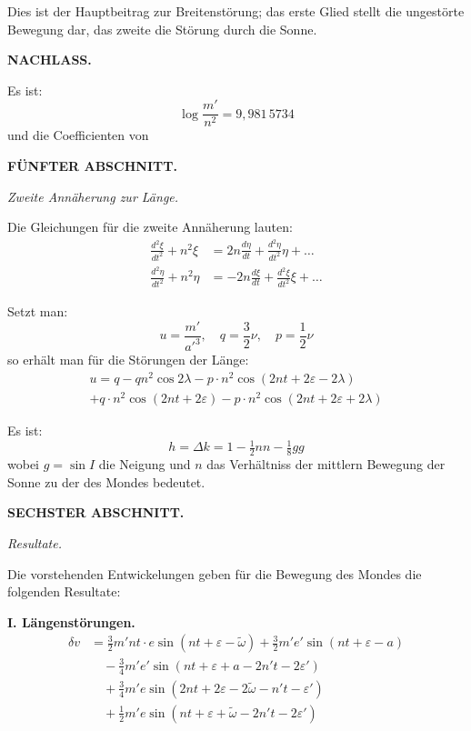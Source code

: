 \documentclass[10pt,a4paper]{article}
\begin{document}
Dies ist der Hauptbeitrag zur Breitenst\"orung; das erste Glied stellt die ungest\"orte Bewegung dar, das zweite die St\"orung durch die Sonne.

\newpage
\noindent\textbf{NACHLASS.}

\bigskip
\noindent
[9.] Es ist:
\begin{equation*}
\log\frac{m'}{n^2} = 9{,}981\,5734
\end{equation*}
und die Coefficienten von

\medskip
\noindent\textbf{F\"UNFTER ABSCHNITT.}

\medskip
\noindent\textit{Zweite Ann\"aherung zur L\"ange.}

\medskip
\noindent
[10.] Die Gleichungen f\"ur die zweite Ann\"aherung lauten:
\begin{align*}
\frac{d^2\xi}{dt^2} + n^2\xi &= 2n\frac{d\eta}{dt} + \frac{d^2\eta}{dt^2}\eta + \dots \\
\frac{d^2\eta}{dt^2} + n^2\eta &= -2n\frac{d\xi}{dt} + \frac{d^2\xi}{dt^2}\xi + \dots
\end{align*}

\newpage
\noindent
[11.] Setzt man:
\begin{equation*}
u = \frac{m'}{a'^3},\quad q = \frac{3}{2}\nu,\quad p = \frac{1}{2}\nu
\end{equation*}
so erh\"alt man f\"ur die St\"orungen der L\"ange:
\begin{multline*}
u = q - qn^2\cos 2\lambda - p\cdot n^2\cos(2nt + 2\varepsilon - 2\lambda) \\
+ q\cdot n^2\cos(2nt + 2\varepsilon) - p\cdot n^2\cos(2nt + 2\varepsilon + 2\lambda)
\end{multline*}

\newpage
\noindent
[12.] Es ist:
\begin{equation*}
h = \Delta k = 1 - \tfrac{1}{2}nn - \tfrac{1}{8}gg
\end{equation*}
wobei $g = \sin I$ die Neigung und $n$ das Verh\"altniss der mittlern Bewegung der Sonne zu der des Mondes bedeutet.

\bigskip
\noindent\textbf{SECHSTER ABSCHNITT.}

\medskip
\noindent\textit{Resultate.}

\medskip
\noindent
[13.] Die vorstehenden Entwickelungen geben f\"ur die Bewegung des Mondes die folgenden Resultate:

\textbf{I. L\"angenst\"orungen.}
\begin{align*}
\delta v &= \tfrac{3}{2}m'nt\cdot e\sin(nt + \varepsilon - \tilde{\omega}) + \tfrac{3}{2}m'e'\sin(nt + \varepsilon - a) \\
&\quad - \tfrac{3}{4}m'e'\sin(nt + \varepsilon + a - 2n't - 2\varepsilon') \\
&\quad + \tfrac{3}{4}m'e\sin(2nt + 2\varepsilon - 2\tilde{\omega} - n't - \varepsilon') \\
&\quad + \tfrac{1}{2}m'e\sin(nt + \varepsilon + \tilde{\omega} - 2n't - 2\varepsilon')
\end{align*}
\end{document}
